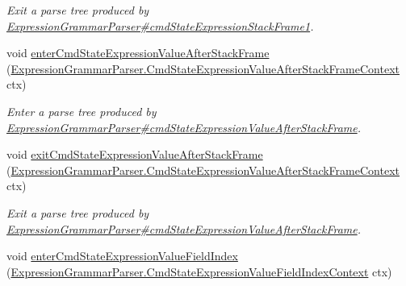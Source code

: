 \begin{DoxyCompactItemize}
\begin{DoxyCompactList}\small\item\em Exit a parse tree produced by \hyperlink{classgov_1_1nasa_1_1jpf_1_1inspector_1_1server_1_1expression_1_1parser_1_1_expression_grammar_parser_a7b51fc0f0baff269b98a4705322e2242}{Expression\+Grammar\+Parser\#cmd\+State\+Expression\+Stack\+Frame1}. \end{DoxyCompactList}\item 
void \hyperlink{interfacegov_1_1nasa_1_1jpf_1_1inspector_1_1server_1_1expression_1_1parser_1_1_expression_grammar_listener_acbbfcb304cc88ed6b9b97be082282ea9}{enter\+Cmd\+State\+Expression\+Value\+After\+Stack\+Frame} (\hyperlink{classgov_1_1nasa_1_1jpf_1_1inspector_1_1server_1_1expression_1_1parser_1_1_expression_grammar_pa89116a9ed8dad2a185081bb1175595f7}{Expression\+Grammar\+Parser.\+Cmd\+State\+Expression\+Value\+After\+Stack\+Frame\+Context} ctx)
\begin{DoxyCompactList}\small\item\em Enter a parse tree produced by \hyperlink{classgov_1_1nasa_1_1jpf_1_1inspector_1_1server_1_1expression_1_1parser_1_1_expression_grammar_parser_a3c4b19fe3874c3c607c97ca475d31322}{Expression\+Grammar\+Parser\#cmd\+State\+Expression\+Value\+After\+Stack\+Frame}. \end{DoxyCompactList}\item 
void \hyperlink{interfacegov_1_1nasa_1_1jpf_1_1inspector_1_1server_1_1expression_1_1parser_1_1_expression_grammar_listener_a1f0731e5c6f568dd30318a7b4dd253db}{exit\+Cmd\+State\+Expression\+Value\+After\+Stack\+Frame} (\hyperlink{classgov_1_1nasa_1_1jpf_1_1inspector_1_1server_1_1expression_1_1parser_1_1_expression_grammar_pa89116a9ed8dad2a185081bb1175595f7}{Expression\+Grammar\+Parser.\+Cmd\+State\+Expression\+Value\+After\+Stack\+Frame\+Context} ctx)
\begin{DoxyCompactList}\small\item\em Exit a parse tree produced by \hyperlink{classgov_1_1nasa_1_1jpf_1_1inspector_1_1server_1_1expression_1_1parser_1_1_expression_grammar_parser_a3c4b19fe3874c3c607c97ca475d31322}{Expression\+Grammar\+Parser\#cmd\+State\+Expression\+Value\+After\+Stack\+Frame}. \end{DoxyCompactList}\item 
void \hyperlink{interfacegov_1_1nasa_1_1jpf_1_1inspector_1_1server_1_1expression_1_1parser_1_1_expression_grammar_listener_a731cb6e5197e7366a9508524b78b16e7}{enter\+Cmd\+State\+Expression\+Value\+Field\+Index} (\hyperlink{classgov_1_1nasa_1_1jpf_1_1inspector_1_1server_1_1expression_1_1parser_1_1_expression_grammar_pa31d705710a4d9acddfdd67c37ac04c8a}{Expression\+Grammar\+Parser.\+Cmd\+State\+Expression\+Value\+Field\+Index\+Context} ctx)

\end{DoxyCompactItemize}

